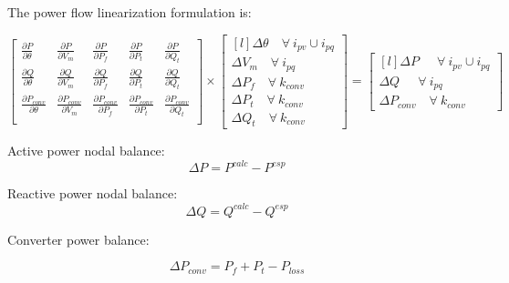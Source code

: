 \documentclass[11pt]{article}
\begin{document}
	The power flow linearization formulation is:
	
	\begin{equation}
		\label{eq:acdc_syst}
		\begin{bmatrix}
			\frac{\partial P}{\partial \theta} & \frac{\partial P}{\partial V_m} & \frac{\partial P}{\partial P_f} & \frac{\partial P}{\partial P_t} & \frac{\partial P}{\partial Q_t}\\
			\frac{\partial Q}{\partial \theta} & \frac{\partial Q}{\partial V_m} & \frac{\partial Q}{\partial P_f} & \frac{\partial Q}{\partial P_t} & \frac{\partial Q}{\partial Q_t}\\
			\frac{\partial P_{conv}}{\partial \theta} & \frac{\partial P_{conv}}{\partial V_m} & \frac{\partial P_{conv}}{\partial P_f} & \frac{\partial P_{conv}}{\partial P_t} & \frac{\partial P_{conv}}{\partial Q_t}\\
		\end{bmatrix}	
		\times 
		\begin{bmatrix*}[l]
			\Delta \theta  \quad \forall \ i_{pv} \cup i_{pq}   \\
			\Delta V_m     \quad \forall \ i_{pq}  \\
			\Delta P_f     \quad \forall \ k_{conv} \\
			\Delta P_t     \quad \forall \ k_{conv} \\
			\Delta Q_t     \quad \forall \ k_{conv}
		\end{bmatrix*}
		= 
		\begin{bmatrix*}[l]
			\Delta P \quad \ \ \forall \ i_{pv} \cup i_{pq} \\
			\Delta Q \quad \ \ \forall \ i_{pq}  \\
			\Delta P_{conv} \quad \forall \ k_{conv} 
		\end{bmatrix*}
	\end{equation}
	
	
	Active power nodal balance:
	\begin{equation}
		\Delta P = P^{calc} - P^{esp}
	\end{equation}
	
	
	Reactive power nodal balance:
	\begin{equation}
		\Delta Q = Q^{calc} - Q^{esp}
	\end{equation}
	
	

		
	Converter power balance:
	
	\begin{equation}
		\Delta P_{conv} = P_f + P_t - P_{loss}
	\end{equation}
	
\end{document}
